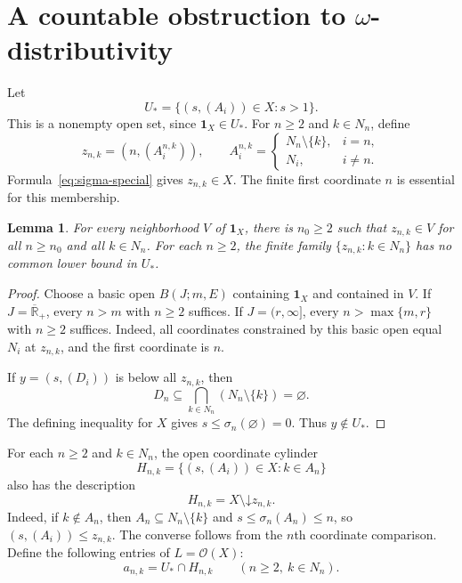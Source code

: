 \documentclass[11pt]{amsart}
\newtheorem{lemma}[theorem]{Lemma}
\theoremstyle{definition}
\theoremstyle{remark}
\numberwithin{equation}{section}
\newcommand{\OO}{\mathcal O}
\newcommand{\RR}{\overline{\mathbb R}_{+}}
\newcommand{\dn}{\mathord\downarrow}
\newcommand{\tops}{\mathbf 1_X}
\begin{document}
\section{A countable obstruction to \texorpdfstring{$\omega$}{omega}-distributivity}
\label{sec:obstruction}

Let
\begin{equation}\label{eq:Ustar}
U_* =\{(s,(A_i))\in X:s>1\}.
\end{equation}
This is a nonempty open set, since $\tops\in U_*$.
For $n\geq2$ and $k\in N_n$, define
\begin{equation}\label{eq:z}
z_{n,k}=(n,(A_i^{n,k})),\qquad
A_i^{n,k}=\begin{cases}
N_n\setminus\{k\},&i=n,\\
N_i,&i\ne n.
\end{cases}
\end{equation}
Formula~\eqref{eq:sigma-special} gives $z_{n,k}\in X$.
The finite first coordinate $n$ is essential for this membership.

\begin{lemma}\label{lem:escape}
For every neighborhood $V$ of $\tops$, there is $n_0\geq2$ such that
$z_{n,k}\in V$ for all $n\geq n_0$ and all $k\in N_n$.
For each $n\geq2$, the finite family $\{z_{n,k}:k\in N_n\}$ has
no common lower bound in $U_*$.
\end{lemma}

\begin{proof}
Choose a basic open $B(J;m,E)$ containing $\tops$ and contained
in $V$. If $J=\RR$, every $n>m$ with $n\geq2$ suffices. If
$J=(r,\infty]$, every $n>\max\{m,r\}$ with $n\geq2$ suffices.
Indeed, all coordinates constrained by this basic open equal
$N_i$ at $z_{n,k}$, and the first coordinate is $n$.

If $y=(s,(D_i))$ is below all $z_{n,k}$, then
\[
D_n\subseteq\bigcap_{k\in N_n}(N_n\setminus\{k\})=\varnothing.
\]
The defining inequality for $X$ gives
$s\leq\sigma_n(\varnothing)=0$. Thus $y\notin U_*$.
\end{proof}

For each $n\geq2$ and $k\in N_n$, the open coordinate cylinder
\[
H_{n,k}=\{(s,(A_i))\in X:k\in A_n\}
\]
also has the description
\begin{equation}\label{eq:complement}
H_{n,k}=X\setminus\dn z_{n,k}.
\end{equation}
Indeed, if $k\notin A_n$, then $A_n\subseteq N_n\setminus\{k\}$
and $s\leq\sigma_n(A_n)\leq n$, so $(s,(A_i))\leq z_{n,k}$.
The converse follows from the $n$th coordinate comparison.
Define the following entries of $L=\OO(X)$:
\begin{equation}\label{eq:entries}
a_{n,k}=U_*\cap H_{n,k}\qquad(n\geq2,\ k\in N_n).
\end{equation}
\end{document}
